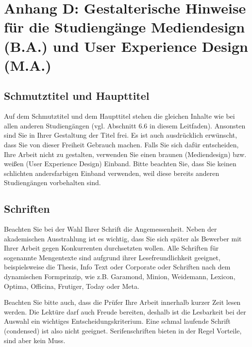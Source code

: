 \chapter*{Anhang D: Gestalterische Hinweise für die Studiengänge Mediendesign (B.A.) und User Experience Design (M.A.)}
\label{app:gestalterische-hinweise}

\section*{Schmutztitel und Haupttitel}

Auf dem Schmutztitel und dem Haupttitel stehen die gleichen Inhalte wie bei allen anderen Studiengängen (vgl. Abschnitt 6.6 in diesem Leitfaden). Ansonsten sind Sie in Ihrer Gestaltung der Titel frei. Es ist auch ausdrücklich erwünscht, dass Sie von dieser Freiheit Gebrauch machen. Falls Sie sich dafür entscheiden, Ihre Arbeit nicht zu gestalten, verwenden Sie einen braunen (Mediendesign) bzw. weißen (User Experience Design) Einband. Bitte beachten Sie, dass Sie keinen schlichten andersfarbigen Einband verwenden, weil diese bereits anderen Studiengängen vorbehalten sind.

\section*{Schriften}

Beachten Sie bei der Wahl Ihrer Schrift die Angemessenheit. Neben der akademischen Ausstrahlung ist es wichtig, dass Sie sich später als Bewerber mit Ihrer Arbeit gegen Konkurrenten durchsetzten wollen. Alle Schriften für sogenannte Mengentexte sind aufgrund ihrer Lesefreundlichkeit geeignet, beispielsweise die Thesis, Info Text oder Corporate oder Schriften nach dem dynamischen Formprinzip, wie z.B. Garamond, Minion, Weidemann, Lexicon, Optima, Officina, Frutiger, Today oder Meta.

Beachten Sie bitte auch, dass die Prüfer Ihre Arbeit innerhalb kurzer Zeit lesen werden. Die Lektüre darf auch Freude bereiten, deshalb ist die Lesbarkeit bei der Auswahl ein wichtiges Entscheidungskriterium. Eine schmal laufende Schrift (condensed) ist also nicht geeignet. Serifenschriften bieten in der Regel Vorteile, sind aber kein Muss.

